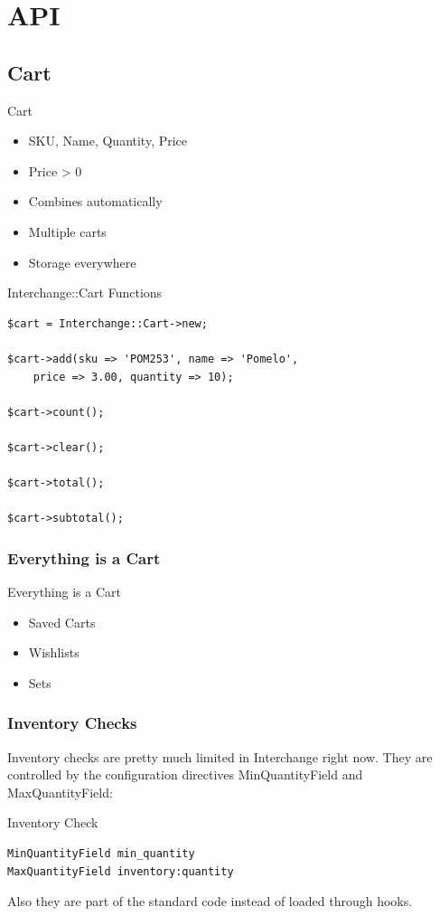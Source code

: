\section{API}
\subsection{Cart}
\begin{frame}{Cart}
\begin{itemize}
\item SKU, Name, Quantity, Price
\item Price > 0
\item Combines automatically
\item Multiple carts
\item Storage everywhere
\end{itemize}
\end{frame}

\begin{frame}[fragile]{Interchange::Cart Functions}
\begin{lstlisting}
$cart = Interchange::Cart->new;

$cart->add(sku => 'POM253', name => 'Pomelo',
    price => 3.00, quantity => 10);

$cart->count();

$cart->clear();

$cart->total();

$cart->subtotal();
\end{lstlisting}
\end{frame}

\subsubsection{Everything is a Cart}
\begin{frame}{Everything is a Cart}
\begin{itemize}
\item Saved Carts
\item Wishlists
\item Sets
\end{itemize}
\end{frame}

\subsubsection{Inventory Checks}
Inventory checks are pretty much limited in Interchange right now.
They are controlled by the configuration directives MinQuantityField
and MaxQuantityField:
\begin{frame}[fragile]{Inventory Check}
\begin{lstlisting}
MinQuantityField min_quantity
MaxQuantityField inventory:quantity 
\end{lstlisting}
\end{frame}
Also they are part of the standard code instead of loaded through
hooks.

